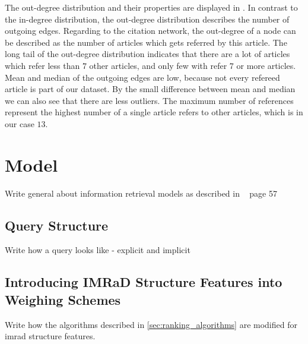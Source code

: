 The out-degree distribution and their properties are displayed in . In contrast to the in-degree distribution, the out-degree distribution describes the number of outgoing edges. Regarding to the citation network, the out-degree of a node can be described as the number of articles which gets referred by this article. The long tail of the out-degree distribution indicates that there are a lot of articles which refer less than $7$ other articles, and only few with refer $7$ or more articles. Mean and median of the outgoing edges are low, because not every refereed article is part of our dataset. By the small difference between mean and median we can also see that there are less outliers. The maximum number of references represent the highest number of a single article refers to other articles, which is in our case $13$.

\section{Model}
\label{sec:model}

Write general about information retrieval models as described in ~\cite{ModernInvormationRetrieval1999} page 57

\subsection{Query Structure}

Write how a query looks like - explicit and implicit

\subsection{Introducing IMRaD Structure Features into Weighing Schemes}

Write how the algorithms described in \cref{sec:ranking_algorithms} are modified for imrad structure features.
